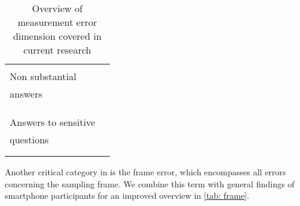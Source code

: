 \begin{table}
\begin{tabular}{ll}
    	& \cite{revilla_testing_2018, huff_comparison_2015}\\
        Non substantial & \cite{revilla_comparing_2018, mavletova_data_2013}\\
    	answers & \cite{antoun_effects_2017, schlosser_mobile_2018}\\
    	& \cite{revilla_open_2016}\\
    	& \cite{toepoel_sliders_2018}\\
    	& \cite{skeie_smartphone_2019}\\
    	Answers to sensitive & \cite{lee_experimental_2019}\\
    	questions & \cite{ mavletova_sensitive_2013}\\
    	& \cite{toninelli_smartphones_2016}\\
        & \cite{mavletova_data_2013, antoun_effects_2017}\\
    	\bottomrule
    \end{tabular}
    \caption{Overview of measurement error dimension covered in current research}
	\label{tab: measurement}
\end{table}


Another critical category in \cite{biemer_total_2010} is the frame error, which encompasses all errors concerning the sampling frame. We combine this term with general findings of smartphone participants for an improved overview in \ref{tab: frame}.

